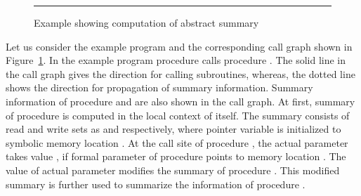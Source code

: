 \begin{figure}[t]
  \begin{center}
  \end{center}
  \hrule
  \caption{\label{fig:codeInter} Example showing computation of abstract summary}
\end{figure}
\begin{example}{\rm 
Let us consider the example program and the corresponding call graph shown in 
Figure~\ref{fig:codeInter}. In the example program procedure 
 calls procedure . The solid line in the call graph gives the direction 
for calling subroutines, whereas, the dotted line shows the direction for propagation 
of summary information. Summary information of procedure  and  are also shown in the call graph. At first, summary of procedure  is computed in the 
local context of itself. The summary consists of read and write sets as 
 and  respectively, where pointer 
variable  is initialized to symbolic memory location . 
At the call site of procedure , the actual parameter  takes value 
, if formal parameter  of procedure  
points to memory location . The value of actual parameter  
modifies the summary of procedure . This modified summary is further used 
to summarize the information of procedure . 

}
\hfill\psframebox{}    
\end{example}












